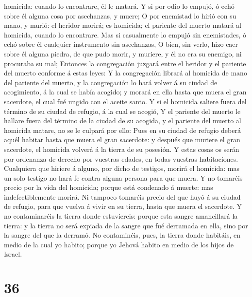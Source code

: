 homicida: cuando lo encontrare, él le matará.  Y si por
odio lo empujó, ó echó sobre él alguna cosa por asechanzas, y muere;
 O por enemistad lo hirió con su mano, y murió: el heridor
morirá; es homicida; el pariente del muerto matará al homicida, cuando
lo encontrare.  Mas si casualmente lo empujó sin
enemistades, ó echó sobre él cualquier instrumento sin asechanzas,
 O bien, sin verlo, hizo caer sobre él alguna piedra, de
que pudo morir, y muriere, y él no era su enemigo, ni procuraba su mal;
 Entonces la congregación juzgará entre el heridor y el
pariente del muerto conforme á estas leyes:  Y la
congregación librará al homicida de mano del pariente del muerto, y la
congregación lo hará volver á su ciudad de acogimiento, á la cual se
había acogido; y morará en ella hasta que muera el gran sacerdote, el
cual fué ungido con el aceite santo.  Y si el homicida
saliere fuera del término de su ciudad de refugio, á la cual se acogió,
 Y el pariente del muerto le hallare fuera del término de
la ciudad de su acogida, y el pariente del muerto al homicida matare, no
se le culpará por ello:  Pues en su ciudad de refugio
deberá aquél habitar hasta que muera el gran sacerdote: y después que
muriere el gran sacerdote, el homicida volverá á la tierra de su
posesión.  Y estas cosas os serán por ordenanza de derecho
por vuestras edades, en todas vuestras habitaciones. 
Cualquiera que hiriere á alguno, por dicho de testigos, morirá el
homicida: mas un solo testigo no hará fe contra alguna persona para que
muera.  Y no tomaréis precio por la vida del homicida;
porque está condenado á muerte: mas indefectiblemente morirá.
 Ni tampoco tomaréis precio del que huyó á su ciudad de
refugio, para que vuelva á vivir en su tierra, hasta que muera el
sacerdote.  Y no contaminaréis la tierra donde estuviereis:
porque esta sangre amancillará la tierra: y la tierra no será expiada de
la sangre que fué derramada en ella, sino por la sangre del que la
derramó.  No contaminéis, pues, la tierra donde habitáis,
en medio de la cual yo habito; porque yo Jehová habito en medio de los
hijos de Israel.

\hypertarget{section-35}{%
\section{36}\label{section-35}}

